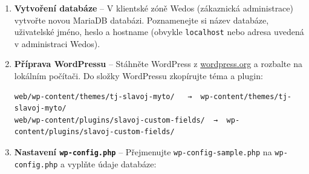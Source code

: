 \begin{enumerate}
\def\labelenumi{\arabic{enumi}.}
\item
  \textbf{Vytvoření databáze} -- V klientské zóně Wedos (zákaznická
  administrace) vytvořte novou MariaDB databázi. Poznamenejte si název
  databáze, uživatelské jméno, heslo a hostname (obvykle
  \texttt{localhost} nebo adresa uvedená v administraci Wedos).
\item
  \textbf{Příprava WordPressu} -- Stáhněte WordPress z
  \href{https://wordpress.org/download/}{wordpress.org} a rozbalte na
  lokálním počítači. Do složky WordPressu zkopírujte téma a plugin:

\begin{verbatim}
web/wp-content/themes/tj-slavoj-myto/   →  wp-content/themes/tj-slavoj-myto/
web/wp-content/plugins/slavoj-custom-fields/  →  wp-content/plugins/slavoj-custom-fields/
\end{verbatim}
\item
  \textbf{Nastavení \texttt{wp-config.php}} -- Přejmenujte
  \texttt{wp-config-sample.php} na \texttt{wp-config.php} a vyplňte
  údaje databáze:

\begin{Shaded}
\begin{Highlighting}[]
\NormalTok{( }\OtherTok{,}     \NormalTok{ )}\OtherTok{;}
\NormalTok{( }\OtherTok{,}     \NormalTok{ )}\OtherTok{;}
\NormalTok{( }\OtherTok{,} \NormalTok{ )}\OtherTok{;}
\NormalTok{( }\OtherTok{,}     \NormalTok{ )}\OtherTok{;}
\NormalTok{( }\OtherTok{,}  \NormalTok{ )}\OtherTok{;}
\end{Highlighting}
\end{Shaded}


\end{enumerate}
